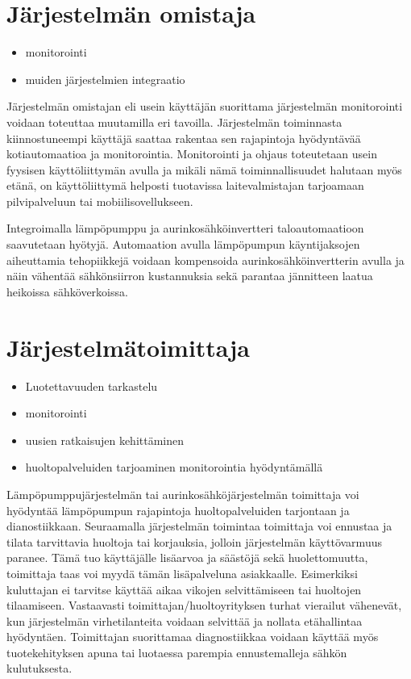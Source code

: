 \section{Järjestelmän omistaja}
  \begin{itemize}
    \item monitorointi
    \item muiden järjestelmien integraatio
  \end{itemize}

  Järjestelmän omistajan eli usein käyttäjän suorittama järjestelmän monitorointi voidaan toteuttaa muutamilla eri tavoilla. Järjestelmän toiminnasta kiinnostuneempi käyttäjä saattaa rakentaa sen rajapintoja hyödyntävää kotiautomaatioa ja monitorointia. Monitorointi ja ohjaus toteutetaan usein fyysisen käyttöliittymän avulla ja mikäli nämä toiminnallisuudet halutaan myös etänä, on käyttöliittymä helposti tuotavissa laitevalmistajan tarjoamaan pilvipalveluun tai mobiilisovellukseen.

  Integroimalla lämpöpumppu ja aurinkosähköinvertteri taloautomaatioon saavutetaan hyötyjä. Automaation avulla lämpöpumpun käyntijaksojen aiheuttamia tehopiikkejä voidaan kompensoida aurinkosähköinvertterin avulla ja näin vähentää sähkönsiirron kustannuksia sekä parantaa jännitteen laatua heikoissa sähköverkoissa.

\section{Järjestelmätoimittaja}
  \begin{itemize}
    \item Luotettavuuden tarkastelu
    \item monitorointi
    \item uusien ratkaisujen kehittäminen
    \item huoltopalveluiden tarjoaminen monitorointia hyödyntämällä
  \end{itemize}

  Lämpöpumppujärjestelmän tai aurinkosähköjärjestelmän toimittaja voi hyödyntää lämpöpumpun rajapintoja huoltopalveluiden tarjontaan ja dianostiikkaan. Seuraamalla järjestelmän toimintaa toimittaja voi ennustaa ja tilata tarvittavia huoltoja tai korjauksia, jolloin järjestelmän käyttövarmuus paranee. Tämä tuo käyttäjälle lisäarvoa ja säästöjä sekä huolettomuutta, toimittaja taas voi myydä tämän lisäpalveluna asiakkaalle. Esimerkiksi kuluttajan ei tarvitse käyttää aikaa vikojen selvittämiseen tai huoltojen tilaamiseen. Vastaavasti toimittajan/huoltoyrityksen turhat vierailut vähenevät, kun järjestelmän virhetilanteita voidaan selvittää ja nollata etähallintaa hyödyntäen. Toimittajan suorittamaa diagnostiikkaa voidaan käyttää myös tuotekehityksen apuna tai luotaessa parempia ennustemalleja sähkön kulutuksesta.

